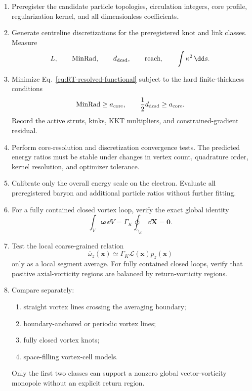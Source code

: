 \begin{enumerate}

\item
Preregister the candidate particle topologies, circulation integers, core
profile, regularization kernel, and all dimensionless coefficients.

\item
Generate centreline discretizations for the preregistered knot and link
classes.  Measure
\[
L,\qquad
\operatorname{MinRad},\qquad
d_{\rm dcsd},\qquad
\operatorname{reach},
\qquad
\int\kappa^2\,\dd s.
\]

\item
Minimize Eq.~\eqref{eq:RT-resolved-functional} subject to the hard
finite-thickness conditions
\[
\operatorname{MinRad}\geq a_{\rm core},
\qquad
\frac12d_{\rm dcsd}\geq a_{\rm core}.
\]
Record the active struts, kinks, KKT multipliers, and constrained-gradient
residual.

\item
Perform core-resolution and discretization convergence tests.  The predicted
energy ratios must be stable under changes in vertex count, quadrature order,
kernel resolution, and optimizer tolerance.

\item
Calibrate only the overall energy scale on the electron.  Evaluate all
preregistered baryon and additional particle ratios without further fitting.

\item
For a fully contained closed vortex loop, verify the exact global identity
\begin{equation}
\int_{V}\bm{\omega}\,\dd V
=
\Gamma_K\oint_{\gamma_K}\dd\bm{X}
=
\bm{0}.
\label{eq:RT-closed-loop-zero-monopole}
\end{equation}

\item
Test the local coarse-grained relation
\begin{equation}
\overline{\omega}_z(\bm{x})
\simeq
\Gamma_K
\mathcal{L}(\bm{x})
p_z(\bm{x})
\label{eq:RT-local-polarization}
\end{equation}
only as a local segment average.  For fully contained closed loops, verify
that positive axial-vorticity regions are balanced by return-vorticity
regions.

\item
Compare separately:
\begin{enumerate}
\item straight vortex lines crossing the averaging boundary;
\item boundary-anchored or periodic vortex lines;
\item fully closed vortex knots;
\item space-filling vortex-cell models.
\end{enumerate}
Only the first two classes can support a nonzero global vector-vorticity
monopole without an explicit return region.


\end{enumerate}
